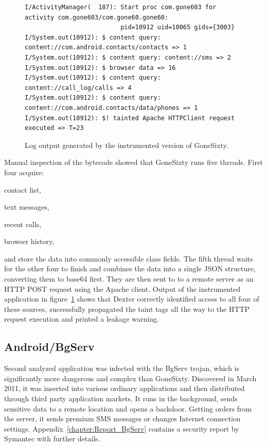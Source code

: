 \documentclass[12pt,twoside,notitlepage]{report}
\begin{document}
\begin{figure}[t]
	\scriptsize
	\begin{verbatim}
I/ActivityManager(  187): Start proc com.gone603 for activity com.gone603/com.gone60.gone60: 
                          pid=10912 uid=10065 gids={3003}
I/System.out(10912): $ content query: content://com.android.contacts/contacts => 1
I/System.out(10912): $ content query: content://sms => 2
I/System.out(10912): $ browser data => 16
I/System.out(10912): $ content query: content://call_log/calls => 4
I/System.out(10912): $ content query: content://com.android.contacts/data/phones => 1
I/System.out(10912): $! tainted Apache HTTPClient request executed => T=23
	\end{verbatim}
	\caption{Log output generated by the instrumented version of GoneSixty.}
	\label{figure:Evaluation_GoneSixty}
\end{figure}

Manual inspection of the bytecode showed that GoneSixty runs five threads. First four acquire:
\begin{inparaenum}[(i)]
\item contact list,
\item text messages,
\item recent calls,
\item browser history,
\end{inparaenum}
and store the data into commonly accessible class fields. The fifth thread waits for the other four to finish and combines the data into a single JSON structure, converting them to base64 first. They are then sent to to a remote server as an HTTP POST request using the Apache client. Output of the instrumented application in figure~\ref{figure:Evaluation_GoneSixty} shows that Dexter correctly identified access to all four of these sources, successfully propagated the taint tags all the way to the HTTP request execution and printed a leakage warning. 

\subsection{Android/BgServ}

Second analyzed application was infected with the BgServ trojan, which is significantly more dangerous and complex than GoneSixty. Discovered in March 2011, it was inserted into various ordinary applications and then distributed through third party application markets. It runs in the background, sends sensitive data to a remote location and opens a backdoor. Getting orders from the server, it sends premium SMS messages or changes Internet connection settings. Appendix~\ref{chapter:Report_BgServ} contains a security report by Symantec with further details. 
\end{document}
